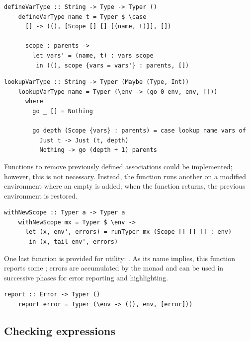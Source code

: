 \documentclass[UdineBachThesis,american,11pt,draft]{PhdThesis}
\begin{document}
  \begin{lstlisting}[gobble=4,basicstyle=\ttfamily\small]
    defineVarType :: String -> Type -> Typer ()
    defineVarType name t = Typer $ \case
      [] -> ((), [Scope [] [] [(name, t)]], [])

      scope : parents ->
        let vars' = (name, t) : vars scope
         in ((), scope {vars = vars'} : parents, [])
  \end{lstlisting}

  \begin{lstlisting}[gobble=4,basicstyle=\ttfamily\small]
    lookupVarType :: String -> Typer (Maybe (Type, Int))
    lookupVarType name = Typer (\env -> (go 0 env, env, []))
      where
        go _ [] = Nothing

        go depth (Scope {vars} : parents) = case lookup name vars of
          Just t -> Just (t, depth)
          Nothing -> go (depth + 1) parents
  \end{lstlisting}

  Functions to remove previously defined associations could be implemented;
  however, this is not necessary. Instead, the function \lstinline@withNewScope@
  runs another \lstinline@Typer@ on a modified environment where an empty
  \lstinline@Scope@ is added; when the function returns, the previous
  environment is restored.

  \begin{lstlisting}[gobble=4,basicstyle=\ttfamily\small]
    withNewScope :: Typer a -> Typer a
    withNewScope mx = Typer $ \env ->
      let (x, env', errors) = runTyper mx (Scope [] [] [] : env)
       in (x, tail env', errors)
  \end{lstlisting}

  One last function is provided for utility: \lstinline@report@. As its name
  implies, this function reports some \lstinline@Error@; errors are accumulated
  by the \lstinline@Typer@ monad and can be used in successive phases for error
  reporting and highlighting.

  \begin{lstlisting}[gobble=4,basicstyle=\ttfamily\small]
    report :: Error -> Typer ()
    report error = Typer (\env -> ((), env, [error]))
  \end{lstlisting}

  \subsection{Checking expressions}
\end{document}
